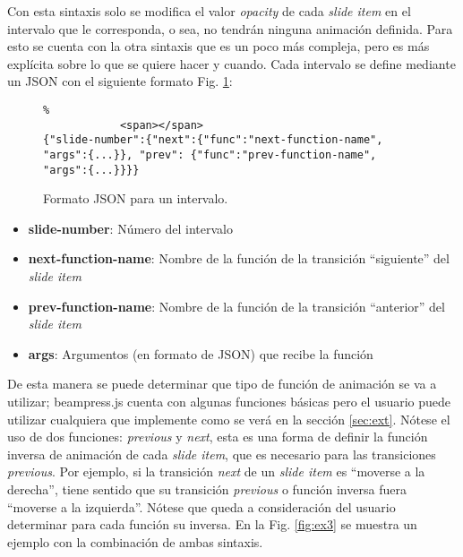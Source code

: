 	Con esta sintaxis solo se modifica el valor \textit{opacity} de cada \textit{slide item} en el intervalo que le corresponda, o sea, no tendrán ninguna animación definida. Para esto se cuenta con la otra sintaxis que es un poco más compleja, pero es más explícita sobre lo que se quiere hacer y cuando. Cada intervalo se define mediante un JSON con el siguiente formato Fig. \ref{fig:ex2}:

		\begin{figure}[htb]%
			\begin{lstlisting}%
			<span></span>
{"slide-number":{"next":{"func":"next-function-name", "args":{...}}, "prev": {"func":"prev-function-name", "args":{...}}}}		
			\end{lstlisting}
		\caption{
			Formato JSON para un intervalo. 
			\label{fig:ex2} }
		\end{figure}

		\begin{itemize}
			\item \textbf{slide-number}: Número del intervalo
			\item \textbf{next-function-name}: Nombre de la función de la transición ``siguiente'' del \textit{slide item}
			\item \textbf{prev-function-name}: Nombre de la función de la transición ``anterior'' del \textit{slide item}			 	
			\item \textbf{args}: Argumentos (en formato de JSON) que recibe la función  
		\end{itemize}


	De esta manera se puede determinar que tipo de función de animación se va a utilizar; beampress.js cuenta con algunas funciones básicas pero el usuario puede utilizar cualquiera que implemente como se verá en la sección \ref{sec:ext}. Nótese el uso de dos funciones: \textit{previous} y \textit{next}, esta es una forma de definir la función inversa de animación de cada \textit{slide item}, que es necesario para las transiciones \textit{previous}. Por ejemplo, si la transición \textit{next} de un \textit{slide item} es ``moverse a la derecha'', tiene sentido que su transición \textit{previous} o función inversa fuera ``moverse a la izquierda''. Nótese que queda a consideración del usuario determinar para cada función su inversa. En la Fig. \ref{fig:ex3} se muestra un ejemplo con la combinación de ambas sintaxis.

